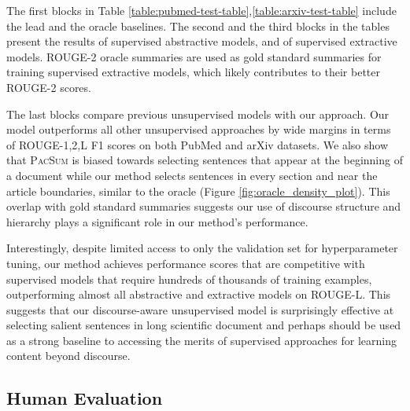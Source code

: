 \documentclass[11pt,a4paper]{article}
\begin{document}
The first blocks in Table \ref{table:pubmed-test-table},\ref{table:arxiv-test-table} include the lead  and the oracle baselines. The second and the third blocks in the tables present the results of supervised abstractive models, and of supervised extractive models. ROUGE-2 oracle summaries are used as gold standard summaries for training supervised extractive models, which likely contributes to their better ROUGE-2 scores.

The last blocks compare previous unsupervised models with our approach. Our model outperforms all other unsupervised approaches by wide margins in terms of ROUGE-1,2,L F1 scores on both PubMed and arXiv datasets. We also show that \textsc{PacSum} is biased towards selecting sentences that appear at the beginning of a document while our method selects sentences in every section and near the article boundaries, similar to the oracle (Figure \ref{fig:oracle_density_plot}). This overlap with gold standard summaries suggests our use of discourse structure and hierarchy plays a significant role in our method's performance. 

Interestingly, despite limited access to only the validation set for hyperparameter tuning, our method achieves performance scores that are competitive with supervised models that require hundreds of thousands of training examples, outperforming almost all abstractive and extractive models on ROUGE-L. This suggests that our discourse-aware unsupervised model is surprisingly effective at selecting salient sentences in long scientific document and perhaps should be used as a strong baseline to accessing the merits of supervised approaches for learning content beyond discourse. 
 
\subsection{Human Evaluation}\label{sub-sec:human_eval_result}
\begin{table}[!t]
    \centering
\caption{\label{table:pubmed-human_eval_results} Human evaluation results on 20 sampled reference summaries with 281 system summary sentences from PubMed. Each reference summary-sentence pair is annotated by two annotators with an average annotator agreement of 73.24\%. The results are averaged across 127 sentences from HipoRank and154 sentences from state-of-the-art unsupervised extractive summarization system \textsc{PacSum} \citep{zheng2019sentence}..}\label{tab:human_eval}
\end{table}
\end{document}
